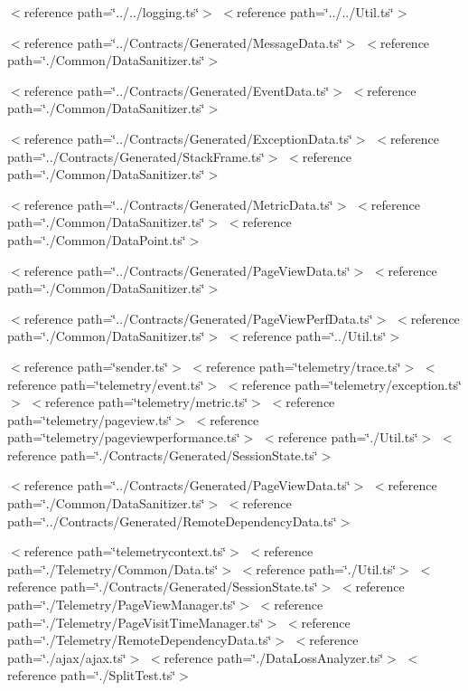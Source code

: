 $<$reference path=\char`\"{}../../logging.\+ts\char`\"{}$>$ $<$reference path=\char`\"{}../../\+Util.\+ts\char`\"{}$>$

$<$reference path=\char`\"{}../\+Contracts/\+Generated/\+Message\+Data.\+ts\char`\"{}$>$ $<$reference path=\char`\"{}./\+Common/\+Data\+Sanitizer.\+ts\char`\"{}$>$

$<$reference path=\char`\"{}../\+Contracts/\+Generated/\+Event\+Data.\+ts\char`\"{}$>$ $<$reference path=\char`\"{}./\+Common/\+Data\+Sanitizer.\+ts\char`\"{}$>$

$<$reference path=\char`\"{}../\+Contracts/\+Generated/\+Exception\+Data.\+ts\char`\"{}$>$ $<$reference path=\char`\"{}../\+Contracts/\+Generated/\+Stack\+Frame.\+ts\char`\"{}$>$ $<$reference path=\char`\"{}./\+Common/\+Data\+Sanitizer.\+ts\char`\"{}$>$

$<$reference path=\char`\"{}../\+Contracts/\+Generated/\+Metric\+Data.\+ts\char`\"{}$>$ $<$reference path=\char`\"{}./\+Common/\+Data\+Sanitizer.\+ts\char`\"{}$>$ $<$reference path=\char`\"{}./\+Common/\+Data\+Point.\+ts\char`\"{}$>$

$<$reference path=\char`\"{}../\+Contracts/\+Generated/\+Page\+View\+Data.\+ts\char`\"{}$>$ $<$reference path=\char`\"{}./\+Common/\+Data\+Sanitizer.\+ts\char`\"{}$>$

$<$reference path=\char`\"{}../\+Contracts/\+Generated/\+Page\+View\+Perf\+Data.\+ts\char`\"{}$>$ $<$reference path=\char`\"{}./\+Common/\+Data\+Sanitizer.\+ts\char`\"{}$>$ $<$reference path=\char`\"{}../\+Util.\+ts\char`\"{}$>$

$<$reference path=\char`\"{}sender.\+ts\char`\"{}$>$ $<$reference path=\char`\"{}telemetry/trace.\+ts\char`\"{}$>$ $<$reference path=\char`\"{}telemetry/event.\+ts\char`\"{}$>$ $<$reference path=\char`\"{}telemetry/exception.\+ts\char`\"{}$>$ $<$reference path=\char`\"{}telemetry/metric.\+ts\char`\"{}$>$ $<$reference path=\char`\"{}telemetry/pageview.\+ts\char`\"{}$>$ $<$reference path=\char`\"{}telemetry/pageviewperformance.\+ts\char`\"{}$>$ $<$reference path=\char`\"{}./\+Util.\+ts\char`\"{}$>$ $<$reference path=\char`\"{}./\+Contracts/\+Generated/\+Session\+State.\+ts\char`\"{}$>$

$<$reference path=\char`\"{}../\+Contracts/\+Generated/\+Page\+View\+Data.\+ts\char`\"{}$>$ $<$reference path=\char`\"{}./\+Common/\+Data\+Sanitizer.\+ts\char`\"{}$>$ $<$reference path=\char`\"{}../\+Contracts/\+Generated/\+Remote\+Dependency\+Data.\+ts\char`\"{}$>$

$<$reference path=\char`\"{}telemetrycontext.\+ts\char`\"{}$>$ $<$reference path=\char`\"{}./\+Telemetry/\+Common/\+Data.\+ts\char`\"{}$>$ $<$reference path=\char`\"{}./\+Util.\+ts\char`\"{}$>$ $<$reference path=\char`\"{}./\+Contracts/\+Generated/\+Session\+State.\+ts\char`\"{}$>$ $<$reference path=\char`\"{}./\+Telemetry/\+Page\+View\+Manager.\+ts\char`\"{}$>$ $<$reference path=\char`\"{}./\+Telemetry/\+Page\+Visit\+Time\+Manager.\+ts\char`\"{}$>$ $<$reference path=\char`\"{}./\+Telemetry/\+Remote\+Dependency\+Data.\+ts\char`\"{}$>$ $<$reference path=\char`\"{}./ajax/ajax.\+ts\char`\"{}$>$ $<$reference path=\char`\"{}./\+Data\+Loss\+Analyzer.\+ts\char`\"{}$>$ $<$reference path=\char`\"{}./\+Split\+Test.\+ts\char`\"{}$>$ 

